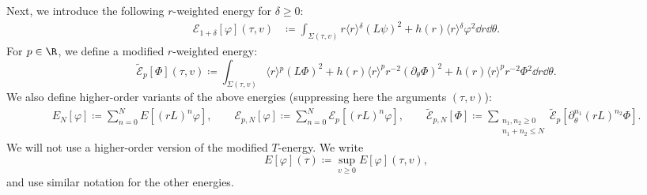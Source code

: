 \documentclass[10pt, reqno]{amsart}
\begin{document}
Next, we introduce the following \(r\)-weighted energy for \(\delta{}\ge 0\):
\begin{equation}
\begin{split}
\mathcal{E}_{1+\delta}[\varphi{}](\tau{},v)&\coloneqq{}\int _{\Sigma{}(\tau{},v)} r\langle{}r\rangle{}^\delta{}(L\psi{})^2 + h(r)\langle{}r\rangle{}^{\delta{}}\varphi^2\dd{}r\dd{}\theta{}.
\end{split}
\end{equation}
For \(p \in \R\), we define a modified \(r\)-weighted energy:
\begin{equation}
\tilde{\mathcal{E}}_p[\Phi{}](\tau{},v) \coloneqq{} \int _{\Sigma{}(\tau{},v)}\langle{}r\rangle{}^p(L\Phi{})^2 + h(r)\langle{}r\rangle^pr^{-2}(\partial{}_\theta{}\Phi{})^2 + h(r)\langle{}r\rangle^pr^{-2}\Phi{}^2\dd{}r\dd{}\theta{}.
\end{equation}
We also define higher-order variants of the above energies (suppressing here the
arguments \((\tau{},v)\)):
\begin{equation}\label{energies-higher-order}
\begin{split}
E_N[\varphi{}]\coloneqq{}\sum_{n=0}^NE[(rL)^n\varphi{}],\qquad  \mathcal{E}_{p,N}[\varphi{}] \coloneqq{}\sum_{n=0}^{N}\mathcal{E}_p[(rL)^n\varphi{}],\qquad  \tilde{\mathcal{E}}_{p,N}[\Phi{}]\coloneqq{}\!\!\!\!\! \sum_{\substack{n_1,n_2\ge 0\\n_1+n_2\le N}} \tilde{\mathcal{E}}_{p}[\partial{}_\theta^{n_1}(rL)^{n_2}\Phi{}].
\end{split}
\end{equation}
We will not use a higher-order version of the modified \(T\)-energy. We write
\begin{equation}
E[\varphi{}](\tau{})\coloneqq{}\sup_{v\ge 0}E[\varphi{}](\tau{},v),
\end{equation}
and use similar notation for the other energies.
\end{document}
